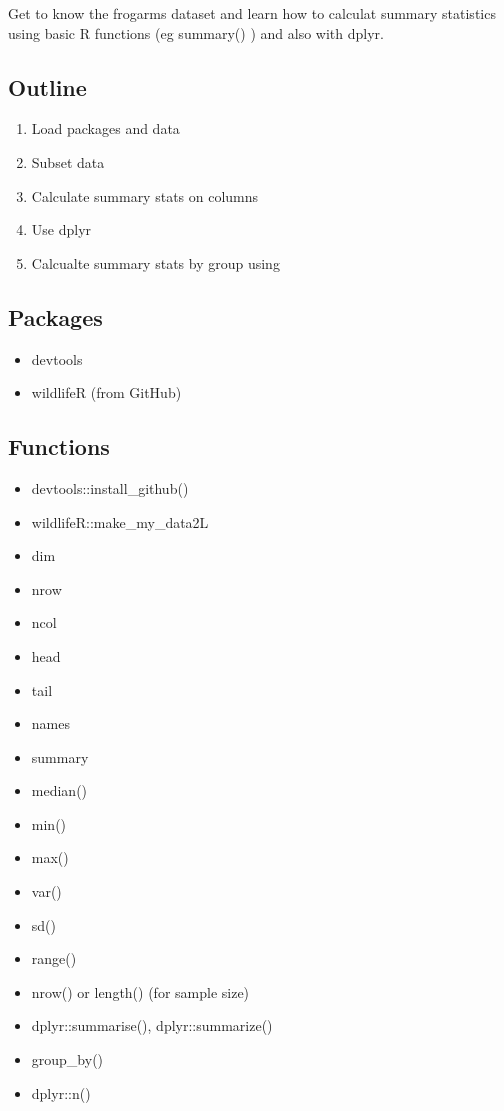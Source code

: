 \documentclass[]{book}
\providecommand{\tightlist}{%
  \setlength{\itemsep}{0pt}\setlength{\parskip}{0pt}}
\theoremstyle{definition}
\theoremstyle{definition}
\theoremstyle{definition}
\theoremstyle{remark}
\begin{document}
Get to know the frogarms dataset and learn how to calculat summary
statistics using basic R functions (eg summary() ) and also with dplyr.

\subsection{Outline}\label{outline-2}

\begin{enumerate}
\def\labelenumi{\arabic{enumi}.}
\tightlist
\item
  Load packages and data
\item
  Subset data
\item
  Calculate summary stats on columns
\item
  Use dplyr
\item
  Calcualte summary stats by group using
\end{enumerate}

\subsection{Packages}\label{packages-7}

\begin{itemize}
\tightlist
\item
  devtools
\item
  wildlifeR (from GitHub)
\end{itemize}

\subsection{Functions}\label{functions-1}

\begin{itemize}
\tightlist
\item
  devtools::install\_github()
\item
  wildlifeR::make\_my\_data2L
\item
  dim
\item
  nrow
\item
  ncol
\item
  head
\item
  tail
\item
  names
\item
  summary
\item
  median()
\item
  min()
\item
  max()
\item
  var()
\item
  sd()
\item
  range()
\item
  nrow() or length() (for sample size)
\item
  dplyr::summarise(), dplyr::summarize()
\item
  group\_by()
\item
  dplyr::n()
\end{itemize}
\end{document}
